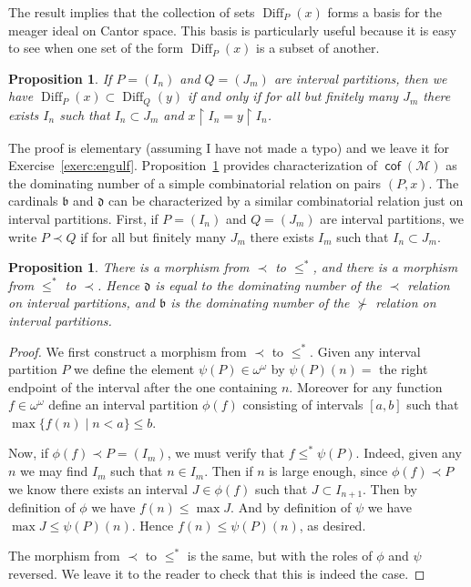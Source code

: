 \documentclass[11pt,oneside]{amsbook}
\newcommand{\Meager}{\mathcal M}
\DeclareMathOperator{\cof}{\mathsf{cof}}
\DeclareMathOperator{\Diff}{Diff}
\theoremstyle{definition}
\theoremstyle{plain}
\newtheorem{prop}[thm]{Proposition}
\theoremstyle{definition}
\theoremstyle{remark}
\begin{document}
The result implies that the collection of sets $\Diff_P(x)$ forms a basis for the meager ideal on Cantor space. This basis is particularly useful because it is easy to see when one set of the form $\Diff_P(x)$ is a subset of another.

\begin{prop}
  \label{prop:engulf}
  If $P=(I_n)$ and $Q=(J_m)$ are interval partitions, then we have $\Diff_P(x)\subset\Diff_Q(y)$ if and only if for all but finitely many $J_m$ there exists $I_n$ such that $I_n\subset J_m$ and $x\restriction I_n=y\restriction I_n$.
\end{prop}

The proof is elementary (assuming I have not made a typo) and we leave it for Exercise~\ref{exerc:engulf}. Proposition~\ref{prop:engulf} provides characterization of $\cof(\Meager)$ as the dominating number of a simple combinatorial relation on pairs $(P,x)$. The cardinals $\mathfrak b$ and $\mathfrak d$ can be characterized by a similar combinatorial relation just on interval partitions. First, if $P=(I_n)$ and $Q=(J_m)$ are interval partitions, we write $P\prec Q$ if for all but finitely many $J_m$ there exists $I_m$ such that $I_n\subset J_m$. 

\begin{prop}
  There is a morphism from $\prec$ to $\leq^*$, and there is a morphism from $\leq^*$ to $\prec$. Hence $\mathfrak d$ is equal to the dominating number of the $\prec$ relation on interval partitions, and $\mathfrak b$ is the dominating number of the $\not\succ$ relation on interval partitions.
\end{prop}

\begin{proof}
  We first construct a morphism from $\prec$ to $\leq^*$. Given any interval partition $P$ we define the element $\psi(P)\in\omega^\omega$ by $\psi(P)(n)=$ the right endpoint of the interval after the one containing $n$. Moreover for any function $f\in\omega^\omega$ define an interval partition $\phi(f)$ consisting of intervals $[a,b]$ such that $\max\{f(n)\mid n<a\}\leq b$.

  Now, if $\phi(f)\prec P=(I_m)$, we must verify that $f\leq^*\psi(P)$. Indeed, given any $n$ we may find $I_m$ such that $n\in I_m$. Then if $n$ is large enough, since $\phi(f)\prec P$ we know there exists an interval $J\in\phi(f)$ such that $J\subset I_{n+1}$. Then by definition of $\phi$ we have $f(n)\leq\max J$. And by definition of $\psi$ we have $\max J\leq\psi(P)(n)$. Hence $f(n)\leq\psi(P)(n)$, as desired.

  The morphism from $\prec$ to $\leq^*$ is the same, but with the roles of $\phi$ and $\psi$ reversed. We leave it to the reader to check that this is indeed the case.
\end{proof}
\end{document}
